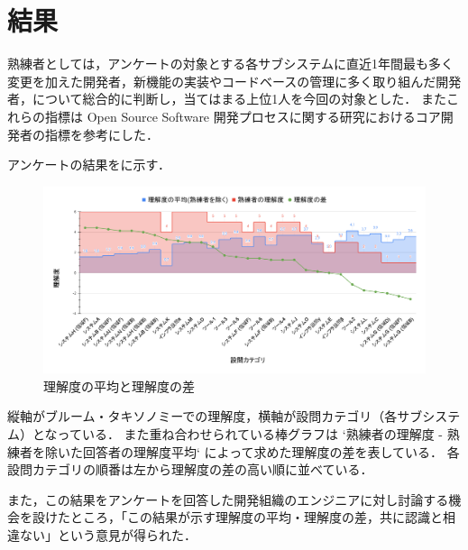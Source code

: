 \section{結果}
熟練者としては，アンケートの対象とする各サブシステムに直近1年間最も多く変更を加えた開発者，新機能の実装やコードベースの管理に多く取り組んだ開発者，について総合的に判断し，当てはまる上位1人を今回の対象とした．
またこれらの指標は Open Source Software 開発プロセスに関する研究\cite{bib:mockus}におけるコア開発者の指標を参考にした．

アンケートの結果をに示す．

\begin{figure}[h]
	\centering
	\includegraphics[keepaspectratio,width=0.9\linewidth]{img/rikai.png}
	\caption{理解度の平均と理解度の差}
	\label{img:rikai}
\end{figure}

縦軸がブルーム・タキソノミーでの理解度，横軸が設問カテゴリ（各サブシステム）となっている．
また重ね合わせられている棒グラフは `熟練者の理解度 - 熟練者を除いた回答者の理解度平均` によって求めた理解度の差を表している．
各設問カテゴリの順番は左から理解度の差の高い順に並べている．

また，この結果をアンケートを回答した開発組織のエンジニアに対し討論する機会を設けたところ，「この結果が示す理解度の平均・理解度の差，共に認識と相違ない」という意見が得られた．
